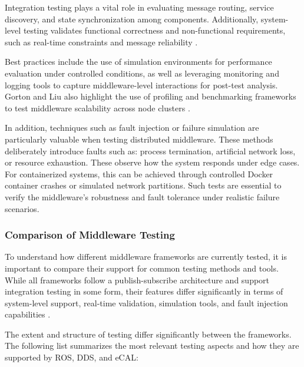 \vspace{1em}
{Integration testing plays a vital role in evaluating message routing, service discovery, and state synchronization among components. Additionally, system-level testing validates functional correctness and non-functional requirements, such as real-time constraints and message reliability \cite{gorton2006software}.

\vspace{1em}
Best practices include the use of simulation environments for performance evaluation under controlled conditions, as well as leveraging monitoring and logging tools to capture middleware-level interactions for post-test analysis. Gorton and Liu also highlight the use of profiling and benchmarking frameworks to test middleware scalability across node clusters \cite{gorton2006software}.

\vspace{1em}
In addition, techniques such as fault injection or failure simulation are particularly valuable when testing distributed middleware. These methods deliberately introduce faults such as: process termination, artificial network loss, or resource exhaustion. These observe how the system responds under edge cases. For containerized systems, this can be achieved through controlled Docker container crashes or simulated network partitions. Such tests are essential to verify the middleware's robustness and fault tolerance under realistic failure scenarios.

\subsubsection{Comparison of Middleware Testing}

To understand how different middleware frameworks are currently tested, it is important to compare their support for common testing methods and tools. While all frameworks follow a publish-subscribe architecture and support integration testing in some form, their features differ significantly in terms of system-level support, real-time validation, simulation tools, and fault injection capabilities \cite{gorton2006software, burns2009real}.

\vspace{1em}
The extent and structure of testing differ significantly between the frameworks. The following list summarizes the most relevant testing aspects and how they are supported by ROS, DDS, and eCAL:

}
